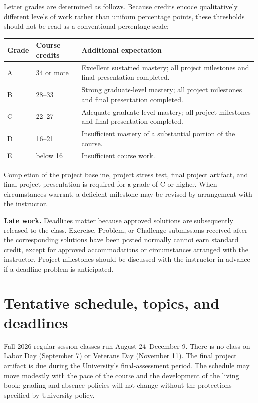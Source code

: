 \documentclass[11pt]{article}
\begin{document}
Letter grades are determined as follows. Because credits encode qualitatively different levels of work rather than uniform percentage points, these thresholds should not be read as a conventional percentage scale:
\begin{center}
\begin{tabular}{p{} p{} p{}}
\toprule
\textbf{Grade} & \textbf{Course credits} & \textbf{Additional expectation}\\
\midrule
A & 34 or more & Excellent sustained mastery; all project milestones and final presentation completed.\\
B & 28--33 & Strong graduate-level mastery; all project milestones and final presentation completed.\\
C & 22--27 & Adequate graduate-level mastery; all project milestones and final presentation completed.\\
D & 16--21 & Insufficient mastery of a substantial portion of the course.\\
E & below 16 & Insufficient course work.\\
\bottomrule
\end{tabular}
\end{center}

Completion of the project baseline, project stress test, final project artifact, and final project presentation is required for a grade of C or higher. When circumstances warrant, a deficient milestone may be revised by arrangement with the instructor.

\textbf{Late work.} Deadlines matter because approved solutions are subsequently released to the class. Exercise, Problem, or Challenge submissions received after the corresponding solutions have been posted normally cannot earn standard credit, except for approved accommodations or circumstances arranged with the instructor. Project milestones should be discussed with the instructor in advance if a deadline problem is anticipated.

\section*{Tentative schedule, topics, and deadlines}

Fall 2026 regular-session classes run August 24--December 9. There is no class on Labor Day (September 7) or Veterans Day (November 11). The final project artifact is due during the University's final-assessment period. The schedule may move modestly with the pace of the course and the development of the living book; grading and absence policies will not change without the protections specified by University policy.
\end{document}
